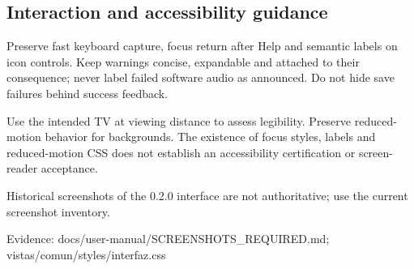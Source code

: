 \subsection{Interaction and accessibility guidance}

Preserve fast keyboard capture, focus return after Help and semantic labels on icon controls. Keep warnings concise, expandable and attached to their consequence; never label failed software audio as announced. Do not hide save failures behind success feedback.

Use the intended TV at viewing distance to assess legibility. Preserve reduced-motion behavior for backgrounds. The existence of focus styles, labels and reduced-motion CSS does not establish an accessibility certification or screen-reader acceptance.

Historical screenshots of the 0.2.0 interface are not authoritative; use the current screenshot inventory.

Evidence: docs/user-manual/SCREENSHOTS\_REQUIRED.md; vistas/comun/styles/interfaz.css
